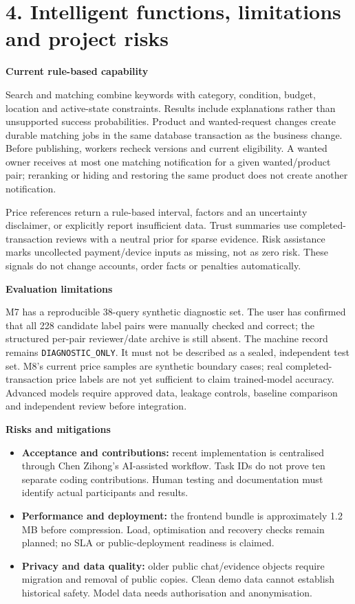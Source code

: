 \documentclass[12pt,a4paper]{article}
\newcommand{\heading}[1]{\vspace{6pt}\textbf{#1}\par}
\begin{document}
\clearpage
\section*{4. Intelligent functions, limitations and project risks}
\heading{Current rule-based capability}
Search and matching combine keywords with category, condition, budget, location and active-state constraints. Results include explanations rather than unsupported success probabilities. Product and wanted-request changes create durable matching jobs in the same database transaction as the business change. Before publishing, workers recheck versions and current eligibility. A wanted owner receives at most one matching notification for a given wanted/product pair; reranking or hiding and restoring the same product does not create another notification.

Price references return a rule-based interval, factors and an uncertainty disclaimer, or explicitly report insufficient data. Trust summaries use completed-transaction reviews with a neutral prior for sparse evidence. Risk assistance marks uncollected payment/device inputs as missing, not as zero risk. These signals do not change accounts, order facts or penalties automatically.

\heading{Evaluation limitations}
M7 has a reproducible 38-query synthetic diagnostic set. The user has confirmed that all 228 candidate label pairs were manually checked and correct; the structured per-pair reviewer/date archive is still absent. The machine record remains \texttt{DIAGNOSTIC\_ONLY}. It must not be described as a sealed, independent test set. M8's current price samples are synthetic boundary cases; real completed-transaction price labels are not yet sufficient to claim trained-model accuracy. Advanced models require approved data, leakage controls, baseline comparison and independent review before integration.

\heading{Risks and mitigations}
\begin{itemize}
\item \textbf{Acceptance and contributions:} recent implementation is centralised through Chen Zihong's AI-assisted workflow. Task IDs do not prove ten separate coding contributions. Human testing and documentation must identify actual participants and results.
\item \textbf{Performance and deployment:} the frontend bundle is approximately 1.2 MB before compression. Load, optimisation and recovery checks remain planned; no SLA or public-deployment readiness is claimed.
\item \textbf{Privacy and data quality:} older public chat/evidence objects require migration and removal of public copies. Clean demo data cannot establish historical safety. Model data needs authorisation and anonymisation.
\end{itemize}
\end{document}

